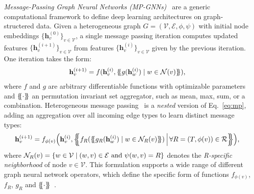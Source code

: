 \emph{Message-Passing Graph Neural Networks (MP-GNNs)}~\citep{gilmer2017mpgnn, fey2019fast} are a generic computational framework to define deep learning architectures on graph-structered data. Given a heterogeneous graph $G=(\mathcal{V}, \mathcal{E}, \phi, \psi)$ with initial node embeddings $\{\mathbf{h}^{(0)}_v\}_{v\in\mathcal{V}}$, a single message passing iteration computes updated features $\{\mathbf{h}^{(i+1)}_v\}_{v\in\mathcal{V}}$ from features $\{\mathbf{h}^{(i)}_v\}_{v\in\mathcal{V}}$ given by the previous iteration.
One iteration takes the form: %
\begin{equation}
\label{eq:mp}
   \mathbf{h}^{(i+1)}_v = f(\mathbf{h}^{(i)}_v, \{\hspace{-0.1cm}\{g(\mathbf{h}^{(i)}_w) \mid w \in \mathcal{N}(v)\}\hspace{-0.1cm}\})\textnormal{,}
\end{equation}
where $f$ and $g$ are arbitrary differentiable functions with optimizable parameters and $\{\hspace{-0.1cm}\{\cdot\}\hspace{-0.1cm}\}$ an permutation invariant set aggregator, such as mean, max, sum, or a combination. Heterogeneous message passing~\citep{schlichtkrull2018relational, hu2020hgt} is a \emph{nested} version of Eq.~\ref{eq:mp}, adding an aggregation over all incoming edge types to learn distinct message types:
\begin{equation}
\label{eq:hmp}
   \mathbf{h}^{(i+1)}_v = f_{\phi(v)}\Bigl(\mathbf{h}^{(i)}_v, \Bigl\{\hspace{-0.15cm}\Bigl\{ f_{R}( \{\hspace{-0.1cm}\{g_{R}(\mathbf{h}^{(i)}_w) \mid w \in \mathcal{N}_R(v)\}\hspace{-0.1cm}\}) \, \Big\vert \, \forall R=(T,\phi(v)) \in \mathcal{R}\Bigr\}\hspace{-0.15cm}\Bigr\}\Bigr)\textnormal{,}
\end{equation}
where $\mathcal{N}_R(v) =\{w\in \mathcal{V} \mid (w,v)\in \mathcal{E} \textnormal{ and } \psi(w, v) = R \}$ denotes the \emph{R-specific neighborhood} of node $v\in \mathcal{V}$.
This formulation supports a wide range of different graph neural network operators, which define the specific form of functions $f_{\phi(v)}$, $f_{R}$, $g_{R}$ and $\{\hspace{-0.1cm}\{\cdot\}\hspace{-0.1cm}\}$~\citep{fey2019fast}.

